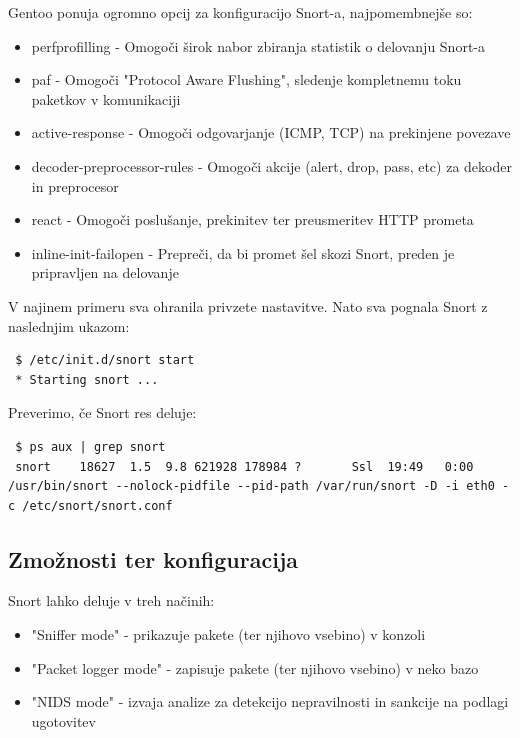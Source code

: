 \documentclass[12pt]{article}
\begin{document}
Gentoo ponuja ogromno opcij za konfiguracijo Snort-a, najpomembnejše so:

\begin{itemize}
    \item perfprofilling - Omogoči širok nabor zbiranja statistik o delovanju Snort-a
    \item paf - Omogoči "Protocol Aware Flushing", sledenje kompletnemu toku paketkov v komunikaciji
    \item active-response - Omogoči odgovarjanje (ICMP, TCP) na prekinjene povezave
    \item decoder-preprocessor-rules - Omogoči akcije (alert, drop, pass, etc) za dekoder in preprocesor
    \item react - Omogoči poslušanje, prekinitev ter preusmeritev HTTP prometa
    \item inline-init-failopen - Prepreči, da bi promet šel skozi Snort, preden je pripravljen na delovanje
\end{itemize}

V najinem primeru sva ohranila privzete nastavitve. Nato sva pognala Snort z naslednjim ukazom:

\begin{verbatim}
 $ /etc/init.d/snort start
 * Starting snort ...
\end{verbatim}

Preverimo, če Snort res deluje:

\begin{verbatim}
 $ ps aux | grep snort
 snort    18627  1.5  9.8 621928 178984 ?       Ssl  19:49   0:00 /usr/bin/snort --nolock-pidfile --pid-path /var/run/snort -D -i eth0 -c /etc/snort/snort.conf
\end{verbatim}


\subsection{Zmožnosti ter konfiguracija}

Snort lahko deluje v treh načinih:

\begin{itemize}
    \item "Sniffer mode" - prikazuje pakete (ter njihovo vsebino) v konzoli
    \item "Packet logger mode" - zapisuje pakete (ter njihovo vsebino) v neko bazo
    \item "NIDS mode" - izvaja analize za detekcijo nepravilnosti in sankcije na podlagi ugotovitev
\end{itemize}
\end{document}
